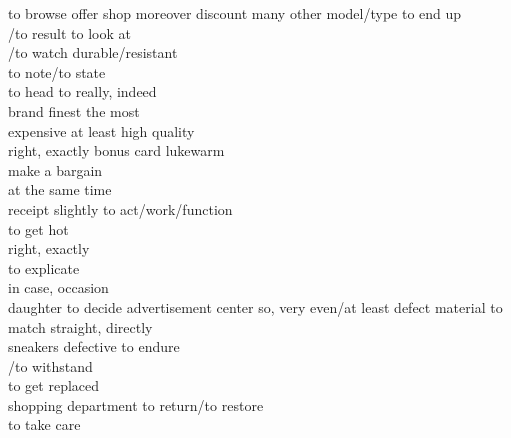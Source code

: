 \begin{questions}
\begin{multicols}{3}
  \raggedcolumns
  \question to browse \fillin
  \question offer \fillin
  \question shop \fillin
  \question moreover \fillin
  \question discount \fillin
  \question many \fillin
  \question other \fillin
  \question model/type \fillin
  \question to end up\\/to result \fillin
  \question to look at\\/to watch \fillin
  \question durable/resistant \\\fillin
  \question to note/to state \\\fillin
  \question to head to \fillin
  \question really, indeed \\\fillin
  \question brand \fillin
  \question finest \fillin
  \question the most\\expensive \fillin
  \question at least \fillin
  \question high quality \\\fillin
  \question right, exactly \fillin
  \question bonus card \fillin
  \question lukewarm \\ \fillin
  \question make a bargain \\ \fillin
  \question at the same time \\ \fillin
  \question receipt \fillin
  \question slightly \fillin
  \question to act/work/function \\ \fillin
  \question to get hot \\ \fillin
  \question right, exactly \\ \fillin
  \question to explicate \\ \fillin
  \question in case, occasion \\ \fillin
  \question daughter \fillin
  \question to decide \fillin
  \question advertisement \fillin
  \question center \fillin
  \question so, very \fillin
  \question even/at least \fillin[][0.5in]
  \question defect \fillin
  \question material \fillin
  \question to match \fillin
  \question straight, directly \\\fillin[][0.8in]
  \question sneakers \fillin
  \question defective \fillin
  \question to endure\\/to withstand \\\fillin
  \question to get replaced\\ \fillin[][0.8in]
  \question shopping \fillin
  \question department \fillin[][0.6in]
  \question to return/to restore\\ \fillin
  \question to take care \fillin[][0.6in]

\end{multicols}
\end{questions}
